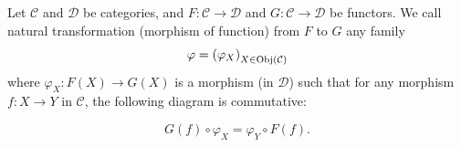 \begin{definitionenv}
    Let $\mathcal{C}$ and $\mathcal{D}$ be categories, and $F:\mathcal{C}\rightarrow \mathcal{D}$ and $G:\mathcal{C}\rightarrow\mathcal{D}$ be functors. We call natural transformation (morphism of function) from $F$ to $G$ any family
    $$\varphi=\left(\varphi_X\right)_{X\in \operatorname{\mathrm{Obj}}(\mathcal{C})}$$
    where $\varphi_X:F(X)\rightarrow G(X)$ is a morphism (in $\mathcal{D}$) such that for any morphism $f:X\rightarrow Y$ in $\mathcal{C}$, the following diagram is commutative:
    \begin{center}
\end{center}
$$G(f)\circ \varphi_X=\varphi_Y\circ F(f).$$
\begin{figure}[H]
    \centering



\begin{tikzpicture}[x=0.75pt,y=0.75pt,yscale=-1,xscale=1, scale = 0.8]


\end{tikzpicture}
\end{figure}
\end{definitionenv}
